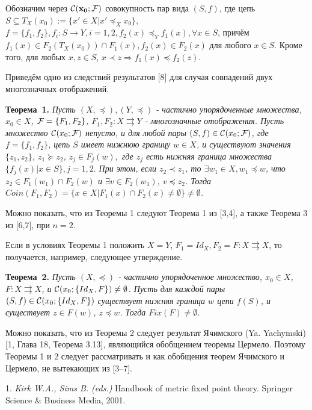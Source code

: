 Обозначим через  ${\bf {\cal C}(x_{0}; {\cal F})}$ совокупность пар вида $(S,f)$, где цепь
$S\subseteq T_{X}(x_{0}):=\{x'\in X |x'\preceq_{X} x_{0}\}$,
$f=\{f_{1}, f_{2}\}, f_{i}: S\to Y,  i=1,2, f_{2}(x)\preceq_{Y} f_{1}(x), \forall x\in S$, причём $f_{1}(x) \in  F_{2}(T_X(x_0))\cap F_{1}(x), f_2(x) \in F_2(x)$ для любого $x\in S$. Кроме того, для любых $x,z\in S$, $x\prec z\Longrightarrow f_{1}(x)\preceq f_{2}(z).$

Приведём  одно из следствий  результатов [8] для случая совпадений двух многозначных  отображений.

\textbf{Теорема~1.} {\it  Пусть $(X,\preceq), (Y,\preceq)$  - частично упорядоченные множества, $x_{0}\in X$, ${\cal F}=\{F_{1},F_{2}\}$,  $F_{1},F_{2}: X\rightrightarrows Y$ - многозначные отображения. Пусть множество ${\cal C}(x_{0}; {\cal F})$ непусто, и для любой пары $(S,f)\in {\cal C}(x_{0}; {\cal F})$, где $f=\{f_{1},f_{2}\}$, цепь $S$ имеет нижнюю границу $w\in X$, и существуют значения  $\{z_{1},z_{2}\}$, $z_{1}\succeq z_{2}$, $z_{j}\in F_{j}(w),$  где $z_{j}$ есть нижняя граница множества $\{f_{j}(x)| x\in S\}, j=1,2.$ При этом, если $z_{2}\prec z_{1}$, то  $\exists w_{1}\in X, w_{1}\preceq w$, что   $z_{2}\in F_{1}(w_{1})\cap F_{2}(w)$ и  $\exists v\in F_{2}(w_{1})$, $v\preceq z_{2}$. Тогда   $Coin(F_{1},F_{2})=\{x\in X| F_{1}(x)\cap F_{2}(x)\ne \emptyset\}\ne \emptyset$.}

Можно показать, что из Теоремы 1 следуют Теорема 1 из [3,4], а также Теорема 3 из [6,7], при $n=2$.

Если в условиях Теоремы 1 положить  $X=Y$, $F_{1}=Id_{X}, F_{2}=F: X\rightrightarrows X$, то  получается, например, следующее утверждение.

\textbf{Теорема~2.} {\it Пусть $(X,\preceq)$  - частично упорядоченное множество, $x_{0}\in X$,   $F: X\rightrightarrows X$, и ${\cal C}(x_{0}; \{Id_{X}, F\})\ne \emptyset$. Пусть для каждой пары $(S,f)\in {\cal C}(x_{0}; \{Id_{X}, F\})$ существует нижняя граница $w$  цепи $f(S)$, и существует $z\in F(w)$, $z\preceq w$. Тогда $Fix(F)\ne \emptyset$.}

Можно показать, что из Теоремы 2 следует результат Ячимского (Ya. Yachymski) [1, Глава 18, Теорема 3.13], являющийся обобщением теоремы Цермело. Поэтому Теоремы 1 и 2 следует рассматривать и как обобщения  теорем Ячимского и  Цермело, не вытекающих из [3--7].



\litlist


1. {\it Kirk W.A., Sims B. (eds.)} Handbook of metric fixed point theory. Springer Science \& Business Media,  2001.

